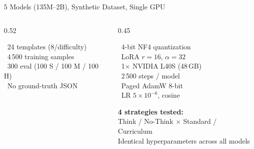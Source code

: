 \documentclass[10pt, aspectratio=169]{beamer}
\begin{document}
\begin{frame}{5 Models (135M–2B), Synthetic Dataset, Single GPU}
\begin{columns}[T]
\begin{column}{0.52\textwidth}
      \begin{tcolorbox}[insightbox=sky, title={\small Dataset}]
        \scriptsize
        \textcolor{sky}{\faFile}~24 templates (8/difficulty)\\[0.15em]
        \textcolor{sky}{\faLayerGroup}~4\,500 training samples\\[0.15em]
        \textcolor{sky}{\faChartBar}~300 eval (100 S / 100 M / 100 H)\\[0.15em]
        \textcolor{sky}{\faBan}~No ground-truth JSON
      \end{tcolorbox}
    \end{column}
    \begin{column}{0.45\textwidth}
      \begin{tcolorbox}[insightbox=sky, title={\small Configuration}]
        \scriptsize
        \textcolor{sky}{\faHdd}~4-bit NF4 quantization\\[0.15em]
        \textcolor{sky}{\faSitemap}~LoRA $r{=}16$,\; $\alpha{=}32$\\[0.15em]
        \textcolor{sky}{\faMicrochip}~1$\times$ NVIDIA L40S (48\,GB)\\[0.15em]
        \textcolor{sky}{\faRedo}~2\,500 steps / model\\[0.15em]
        \textcolor{sky}{\faCog}~Paged AdamW 8-bit\\[0.2em]
        \textcolor{sky}{\faGraduationCap}~LR $5{\times}10^{-6}$, cosine
      \end{tcolorbox}
      \vspace{0.3em}
      \begin{tcolorbox}[insightbox=gold]
        \scriptsize\textbf{4 strategies tested:}\\[2pt]
        Think / No-Think $\times$ Standard / Curriculum\\[2pt]
        Identical hyperparameters across all models
      \end{tcolorbox}
    \end{column}
  \end{columns}
\end{frame}
\end{document}
